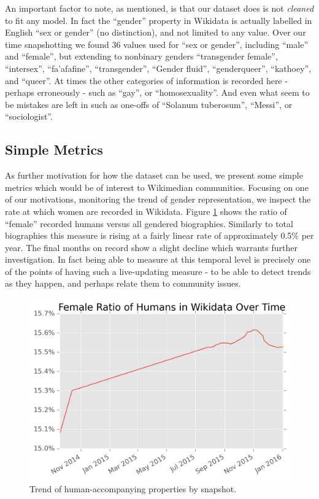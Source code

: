 \documentclass[letterpaper]{article}
\begin{document}
An important factor to note, as mentioned, is that our dataset does is not \textit{cleaned} to fit any model. In fact the ``gender'' property in Wikidata is actually labelled in English ``sex or gender'' (no distinction), and not limited to any value. Over our time snapshotting we found 36 values used for ``sex or gender'', including ``male'' and ``female'', but extending to nonbinary genders ``transgender female'', ``intersex'', ``fa'afafine'', ``transgender'', ``Gender fluid'',  ``genderqueer'', ``kathoey'', and ``queer''. At times the other categories of information is recorded here - perhaps erroneously - such as ``gay'', or ``homosexuality''. And even what seem to be mistakes are left in such as one-offs of ``Solanum tuberosum'', ``Messi'', or ``sociologist''.

\subsection{Simple Metrics}
As further motivation for how the dataset can be used, we present some simple metrics which would be of interest to Wikimedian communities. Focusing on one of our motivations, monitoring the trend of gender representation, we inspect the rate at which women are recorded in Wikidata. Figure \ref{fig:frb} shows the ratio of ``female'' recorded humans versus all gendered biographies. Similarly to total biographies this measure is rising at a fairly linear rate of approximately 0.5\% per year. The final months on record show a slight decline which warrants further investigation. In fact being able to measure at this temporal level is precisely one of the points of having such a live-updating measure - to be able to detect trends as they happen, and perhaps relate them to community issues. 

\begin{figure}
\label{fig:frb}
\includegraphics[scale=0.6]{figures/frbwikidata.png} 
\caption{Trend of human-accompanying properties by snapshot.}
\end{figure}
\end{document}
